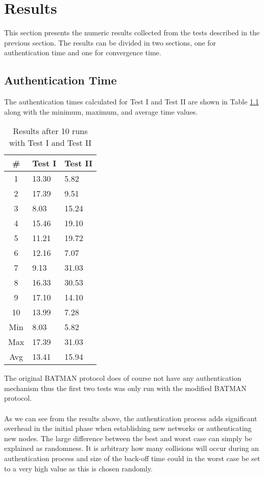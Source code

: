 \chapter{Results}
\label{results}

This section presents the numeric results collected from the tests described in the previous section. The results can be divided in two sections, one for authentication time and one for convergence time.

\section{Authentication Time}

The authentication times calculated for Test I and Test II are shown in Table \ref{tab:auth_time_test_result} along with the minimum, maximum, and average time values.

\begin{table}[ht!]
	\centering
	\begin{tabular}{ | c | l | l | }
	\hline
	\textbf{\#} & \textbf{Test I} & \textbf{Test II}\\ \hline
		1 & 13.30 & 5.82 \\ \hline
		2 & 17.39 & 9.51 \\ \hline
		3 & 8.03 & 15.24 \\ \hline
		4 & 15.46 & 19.10 \\ \hline
		5 & 11.21 & 19.72 \\ \hline
		6 & 12.16 & 7.07 \\ \hline
		7 & 9.13 & 31.03 \\ \hline
		8 & 16.33 & 30.53 \\ \hline
		9 & 17.10 & 14.10 \\ \hline
		10 & 13.99 & 7.28 \\ \hline \hline
		Min & 8.03 & 5.82 \\ \hline
		Max & 17.39 & 31.03 \\ \hline
		Avg & 13.41 & 15.94 \\ \hline
	\end{tabular}
	\caption{Results after 10 runs with Test I and Test II}
	\label{tab:auth_time_test_result}
\end{table}

\noindent
The original BATMAN protocol does of course not have any authentication mechanism thus the first two tests was only run with the modified BATMAN protocol.
\\\\
As we can see from the results above, the authentication process adds significant overhead in the initial phase when establishing new networks or authenticating new nodes. The large difference between the best and worst case can simply be explained as randomness. It is arbitrary how many collisions will occur during an authentication process and size of the back-off time could in the worst case be set to a very high value as this is chosen randomly. 

